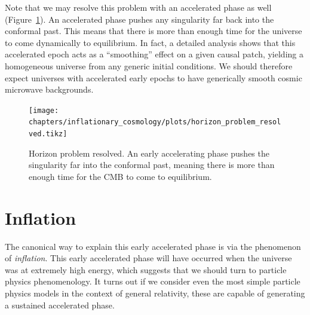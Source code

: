 Note that we may resolve this problem with an accelerated phase as well (Figure~\ref{fig:cos:horizon_problem_resolved}). An accelerated phase pushes any singularity far back into the conformal past. This means that there is more than enough time for the universe to come dynamically to equilibrium. In fact, a detailed analysis shows that this accelerated epoch acts as a ``smoothing'' effect on a given causal patch, yielding a homogeneous universe from any generic initial conditions. We should therefore expect universes with accelerated early epochs to have generically smooth cosmic microwave backgrounds.


\begin{figure}[tp]
  \centering
  \texttt{[image: chapters/inflationary\_cosmology/plots/horizon\_problem\_resolved.tikz]}
  \caption{Horizon problem resolved. An early accelerating phase pushes the singularity far into the conformal past, meaning there is more than enough time for the CMB to come to equilibrium.}\label{fig:cos:horizon_problem_resolved}
\end{figure}

\section{Inflation}
The canonical way to explain this early accelerated phase is via the phenomenon of {\em inflation}. This early accelerated phase will have occurred when the universe was at extremely high energy, which suggests that we should turn to particle physics phenomenology.
It turns out if we consider even the most simple particle physics models in the context of general relativity, these are capable of generating a sustained accelerated phase.

